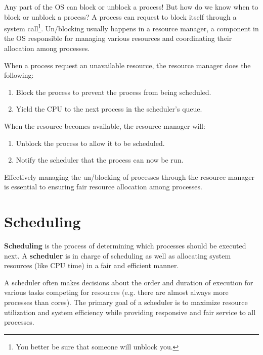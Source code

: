 \documentclass{report}
\newcommand{\definitionBegin}[1]{\begin{tcolorbox}[title={Definition: #1}]}
\newcommand{\definitionEnd}{\end{tcolorbox}}
\newcommand{\exampleBegin}[1]{\begin{tcolorbox}[colback=blue!5!white,colframe=black!75!blue,title={Example:
      #1}]}
\newcommand{\exampleEnd}{\end{tcolorbox}}
\begin{document}
Any part of the OS can block or unblock a process! But how do we know when to block or unblock a process? A
process can request to block itself through a system call\footnote{You better be sure that someone
  will unblock you.}. Un/blocking usually happens in a resource manager, a component in the OS
responsible for managing various resources and coordinating their allocation among processes.

\exampleBegin{Resource Management}
When a process request an unavailable resource, the resource manager does the following:

\begin{enumerate}[label=\textit{(\roman*)}]
\item Block the process to prevent the process from being scheduled.
\item Yield the CPU to the next process in the scheduler's queue.
\end{enumerate}
When the resource becomes available, the resource manager will:

\begin{enumerate}[label=\textit{(\roman*)}]
\item Unblock the process to allow it to be scheduled.
\item Notify the scheduler that the process can now be run.
\end{enumerate}
\exampleEnd

Effectively managing the un/blocking of processes through the resource manager is essential to
ensuring fair resource allocation among processes.





\chapter{Scheduling}
\definitionBegin{Scheduling/Scheduler}
\textbf{Scheduling} is the process of determining which processes should be executed next.
\tcblower
A \textbf{scheduler} is in charge of scheduling as well as allocating system resources (like CPU
time) in a fair and efficient manner.
\definitionEnd

A scheduler often makes decisions about the order and duration of execution for various tasks
competing for resources (e.g. there are almost always more processes than cores). The primary goal
of a scheduler is to maximize resource utilization and system efficiency while providing responsive
and fair service to all processes.
\end{document}
